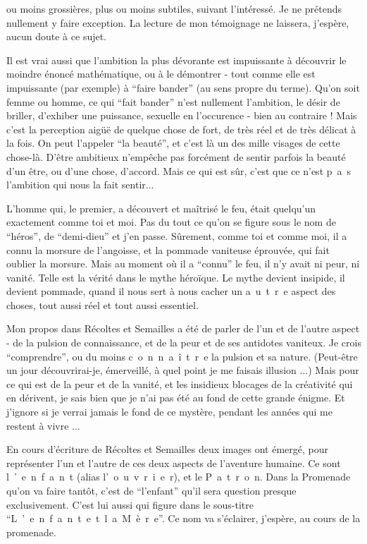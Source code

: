 ou moins grossières, plus ou moins subtiles, suivant l'intéressé. Je ne prétends nullement y faire exception. La lecture de mon témoignage ne laissera, j'espère, aucun doute à ce sujet.

Il est vrai aussi que l'ambition la plus dévorante est impuissante à découvrir le moindre énoncé mathématique, ou à le démontrer - tout comme elle est impuissante (par exemple) à ``faire bander'' (au sens propre du terme). Qu'on soit femme ou homme, ce qui ``fait bander'' n'est nullement l'ambition, le désir de briller, d'exhiber une puissance, sexuelle en l'occurence - bien au contraire ! Mais c'est la perception aigüë de quelque chose de fort, de très réel et de très délicat à la fois. On peut l'appeler ``la beauté'', et c'est là un des mille visages de cette chose-là. D'être ambitieux n'empêche pas forcément de sentir parfois la beauté d'un être, ou d'une chose, d'accord. Mais ce qui est sûr, c'est que ce n'est \mbox{p a s} l'ambition qui nous la fait sentir...

L'homme qui, le premier, a découvert et maîtrisé le feu, était quelqu'un exactement comme toi et moi. Pas du tout ce qu'on se figure sous le nom de ``héros'', de ``demi-dieu'' et j'en passe. Sûrement, comme toi et comme moi, il a connu la morsure de l'angoisse, et la pommade vaniteuse éprouvée, qui fait oublier la morsure. Mais au moment où il a ``connu'' le feu, il n'y avait ni peur, ni vanité. Telle est la vérité dans le mythe héroïque. Le mythe devient insipide, il devient pommade, quand il nous sert à nous cacher un \mbox{a u t r e} aspect des choses, tout aussi réel et tout aussi essentiel.

Mon propos dans Récoltes et Semailles a été de parler de l'un et de l'autre aspect - de la pulsion de connaissance, et de la peur et de ses antidotes vaniteux. Je crois ``comprendre'', ou du moins \mbox{c o n n a î t r e} la pulsion et sa nature. (Peut-être un jour découvrirai-je, émerveillé, à quel point je me faisais illusion ...) Mais pour ce qui est de la peur et de la vanité, et les insidieux blocages de la créativité qui en dérivent, je sais bien que je n'ai pas été au fond de cette grande énigme. Et j'ignore si je verrai jamais le fond de ce mystère, pendant les années qui me restent à vivre ...

En cours d'écriture de Récoltes et Semailles deux images ont émergé, pour représenter l'un et l'autre de ces deux aspects de l'aventure humaine. Ce sont \mbox{l ' e n f a n t} (alias \mbox{l' o u v r i e r}), et le \mbox{P a t r o n}. Dans la Promenade qu'on va faire tantôt, c'est de ``l'enfant'' qu'il sera question presque exclusivement. C'est lui aussi qui figure dans le sous-titre ``\mbox{L ' e n f a n t \quad e t \quad l a \quad M è r e}''. Ce nom va s'éclairer, j'espère, au cours de la promenade.

